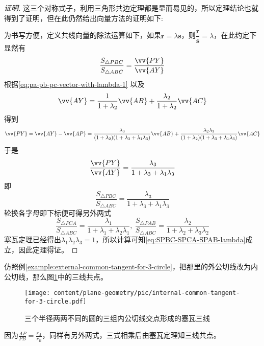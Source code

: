 \begin{example}
\begin{proof}[证明]
   这三个对称式子，利用三角形共边定理都是显而易见的，所以定理结论也就得到了证明，但在此仍然给出向量方法的证明如下:
   
   为书写方便，定义共线向量的除法运算如下，如果$\bm{r}=\lambda\bm{s}$，则$\dfrac{\bm{r}}{\bm{s}}=\lambda$，在此约定下显然有
   \[ \frac{S_{\triangle PBC}}{S_{\triangle ABC}} = \frac{\vv{PY}}{\vv{AY}} \]
   根据\autoref{eq:pa-pb-pc-vector-with-lambda-1} 以及
   \[ \vv{AY} = \frac{1}{1+\lambda_2}\vv{AB}+\frac{\lambda_2}{1+\lambda_2}\vv{AC} \]
   得到
   \[ \vv{PY} = \vv{AY} - \vv{AP} = \frac{\lambda_3}{(1+\lambda_2)(1+\lambda_3+\lambda_1\lambda_3)}\vv{AB} + \frac{\lambda_2\lambda_3}{(1+\lambda_2)(1+\lambda_3+\lambda_1\lambda_3)}\vv{AC} \]
   于是
   \[ \frac{\vv{PY}}{\vv{AY}} = \frac{\lambda_3}{1+\lambda_3+\lambda_1\lambda_3} \]
即
   \[ \frac{S_{\triangle PBC}}{S_{\triangle ABC}} = \frac{\lambda_3}{1+\lambda_3+\lambda_1\lambda_3} \]
   轮换各字母即下标便可得另外两式
   \[ \frac{S_{\triangle PCA}}{S_{\triangle ABC}} = \frac{\lambda_1}{1+\lambda_1+\lambda_2\lambda_1}, \  \frac{S_{\triangle PAB}}{S_{\triangle ABC}} = \frac{\lambda_2}{1+\lambda_2+\lambda_3\lambda_2}  \]
塞瓦定理已经得出$\lambda_1\lambda_2\lambda_3=1$，所以计算可知\autoref{eq:SPBC-SPCA-SPAB-lambda}成立，因此定理得证。
 \end{proof}

\end{example}

\begin{example}
  仿照例\ref{example:external-common-tangent-for-3-circle}，把那里的外公切线改为内公切线，那么图\ref{fig:internal-common-tangent-for-3-circle}中的三线共点。
 
\begin{figure}[htbp]
\centering
\texttt{[image: content/plane-geometry/pic/internal-common-tangent-for-3-circle.pdf]}
\caption{三个半径两两不同的圆的三组内公切线交点形成的塞瓦三线}
\label{fig:internal-common-tangent-for-3-circle}
\end{figure}

因为$\frac{AP}{PB}=\frac{r_A}{r_B}$，同样有另外两式，三式相乘后由塞瓦定理知三线共点。
\end{example}

